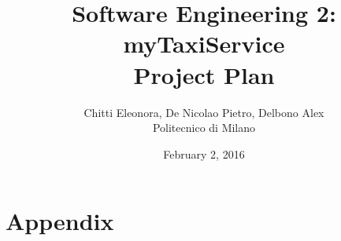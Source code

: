 \documentclass[12pt, a4paper]{report}
\begin{document}
\title{Software Engineering 2: myTaxiService \\ \vspace{1em} Project Plan}
\author{Chitti Eleonora, De Nicolao Pietro, Delbono Alex\\
Politecnico di Milano}
\date{February 2, 2016}
\maketitle
\tableofcontents







\appendix
\chapter{Appendix}




\end{document}
